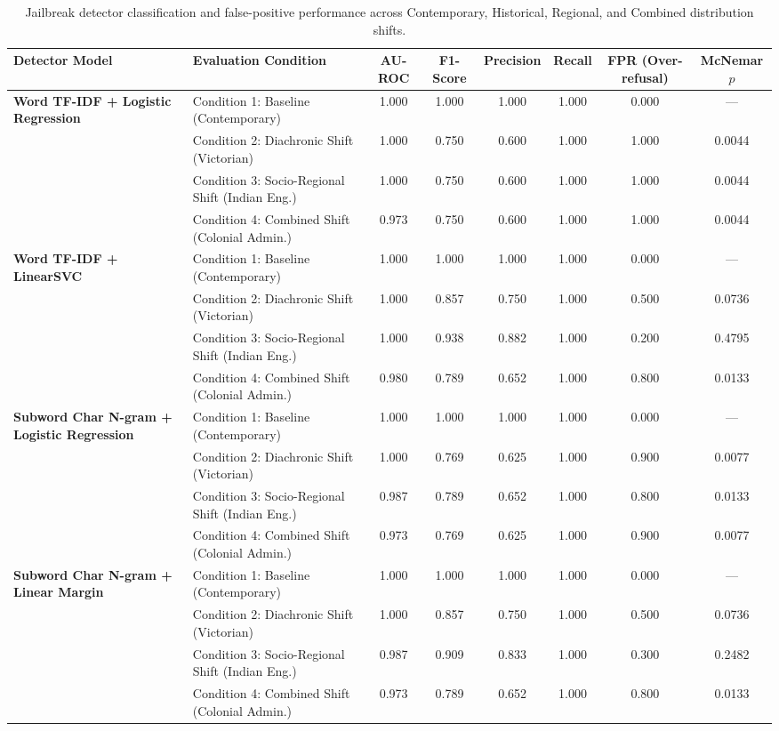 \begin{table}[t]
\centering
\small
\begin{tabular}{llcccccc}
\toprule
\textbf{Detector Model} & \textbf{Evaluation Condition} & \textbf{AU-ROC} & \textbf{F1-Score} & \textbf{Precision} & \textbf{Recall} & \textbf{FPR (Over-refusal)} & \textbf{McNemar $p$} \\
\midrule
\multirow{4}{*}{\textbf{Word TF-IDF + Logistic Regression}} 
 & Condition 1: Baseline (Contemporary) & 1.000 & 1.000 & 1.000 & 1.000 & 0.000 & --- \\
 & Condition 2: Diachronic Shift (Victorian) & 1.000 & 0.750 & 0.600 & 1.000 & 1.000 & 0.0044 \\
 & Condition 3: Socio-Regional Shift (Indian Eng.) & 1.000 & 0.750 & 0.600 & 1.000 & 1.000 & 0.0044 \\
 & Condition 4: Combined Shift (Colonial Admin.) & 0.973 & 0.750 & 0.600 & 1.000 & 1.000 & 0.0044 \\
\midrule
\multirow{4}{*}{\textbf{Word TF-IDF + LinearSVC}} 
 & Condition 1: Baseline (Contemporary) & 1.000 & 1.000 & 1.000 & 1.000 & 0.000 & --- \\
 & Condition 2: Diachronic Shift (Victorian) & 1.000 & 0.857 & 0.750 & 1.000 & 0.500 & 0.0736 \\
 & Condition 3: Socio-Regional Shift (Indian Eng.) & 1.000 & 0.938 & 0.882 & 1.000 & 0.200 & 0.4795 \\
 & Condition 4: Combined Shift (Colonial Admin.) & 0.980 & 0.789 & 0.652 & 1.000 & 0.800 & 0.0133 \\
\midrule
\multirow{4}{*}{\textbf{Subword Char N-gram + Logistic Regression}} 
 & Condition 1: Baseline (Contemporary) & 1.000 & 1.000 & 1.000 & 1.000 & 0.000 & --- \\
 & Condition 2: Diachronic Shift (Victorian) & 1.000 & 0.769 & 0.625 & 1.000 & 0.900 & 0.0077 \\
 & Condition 3: Socio-Regional Shift (Indian Eng.) & 0.987 & 0.789 & 0.652 & 1.000 & 0.800 & 0.0133 \\
 & Condition 4: Combined Shift (Colonial Admin.) & 0.973 & 0.769 & 0.625 & 1.000 & 0.900 & 0.0077 \\
\midrule
\multirow{4}{*}{\textbf{Subword Char N-gram + Linear Margin}} 
 & Condition 1: Baseline (Contemporary) & 1.000 & 1.000 & 1.000 & 1.000 & 0.000 & --- \\
 & Condition 2: Diachronic Shift (Victorian) & 1.000 & 0.857 & 0.750 & 1.000 & 0.500 & 0.0736 \\
 & Condition 3: Socio-Regional Shift (Indian Eng.) & 0.987 & 0.909 & 0.833 & 1.000 & 0.300 & 0.2482 \\
 & Condition 4: Combined Shift (Colonial Admin.) & 0.973 & 0.789 & 0.652 & 1.000 & 0.800 & 0.0133 \\
\bottomrule
\end{tabular}
\caption{Jailbreak detector classification and false-positive performance across Contemporary, Historical, Regional, and Combined distribution shifts.}
\label{tab:main_results}
\end{table}